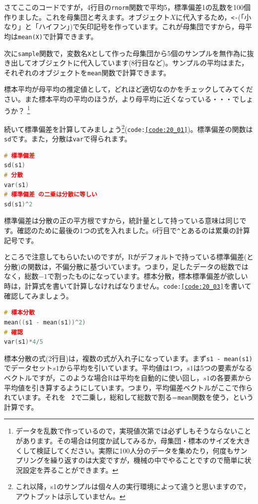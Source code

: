 \documentclass{ltjsbook}
\begin{document}
さてここのコードですが，4行目の\texttt{rnorm}関数で平均5，標準偏差1の乱数を100個作りました。これを母集団と考えます。オブジェクト$X$に代入するため，\verb|<-|(「小なり」と「ハイフン」)で矢印記号を作っています。これが母集団ですから，母平均は\texttt{mean(X)}で計算できます。

次に\texttt{sample}関数で，変数名\texttt{X}として作った母集団から5個のサンプルを無作為に抜き出してオブジェクトに代入しています(8行目など)。サンプルの平均はまた，それぞれのオブジェクトを\texttt{mean}関数で計算できます。

標本平均が母平均の推定値として，どれほど適切なのかをチェックしてみてください。また標本平均の平均のほうが，より母平均に近くなっている・・・でしょうか？ \footnote{データを乱数で作っているので，実現値次第では必ずしもそうならないことがあります。その場合は何度か試してみるか，母集団・標本のサイズを大きくして検証してください。実際に100人分のデータを集めたり，何度もサンプリングを繰り返すのは大変ですが，機械の中でやることですので簡単に状況設定を弄ることができます。}

続いて標準偏差を計算してみましょう\footnote{これ以降，s1のサンプルは個々人の実行環境によって違うと思いますので，アウトプットは示していません。}(\texttt{code:\ref{code:20_01}})。標準偏差の関数は\texttt{sd}です。また，分散は\texttt{var}で得られます。
\begin{lstlisting}[language=c++,label={code:20_02},caption={関数で標準偏差や分散を求める}]
# 標準偏差
sd(s1)
# 分散
var(s1)
# 標準偏差 の二乗は分散に等しい
sd(s1)^2
\end{lstlisting}
標準偏差は分散の正の平方根ですから，統計量として持っている意味は同じです。確認のために最後の1つの式を入れました。6行目で\texttt{\^}とあるのは累乗の計算記号です。

ところで注意してもらいたいのですが，Rがデフォルトで持っている標準偏差(と分散)の関数は，不偏分散に基づいています。つまり，足したデータの総数ではなく，総数$-1$で割ったものになっています。標本分散，標本標準偏差が欲しい時は，計算式を書いて計算しなければなりません。\texttt{code:\ref{code:20_03}}を書いて確認してみましょう。
\begin{lstlisting}[language=c++,label={code:20_03},caption={標本分散を求める}]
# 標本分散
mean((s1 - mean(s1))^2)
# 確認
var(s1)*4/5
\end{lstlisting}

標本分散の式(2行目)は，複数の式が入れ子になっています。まず\texttt{s1 - mean(s1)}でデータセット$s1$から平均を引いています。平均値は1つ，$s1$は5つの要素がなるベクトルですが，このような場合Rは平均を自動的に使い回し，$s1$の各要素から平均値を引き算するようにしています。つまり，平均偏差ベクトルがここで作られています。それを\texttt{\^　2}で二乗し，総和して総数で割る=\texttt{mean}関数を使う，という計算です。
\end{document}
